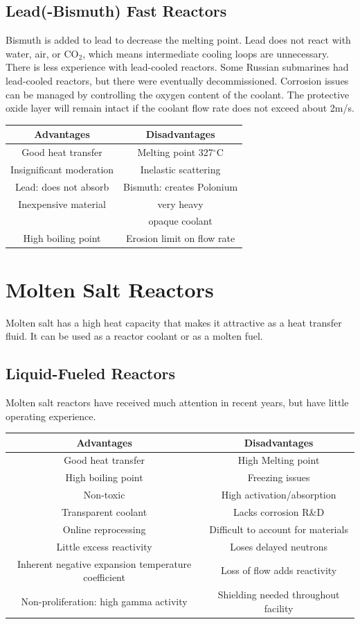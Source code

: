 \subsection{Lead(-Bismuth) Fast Reactors}
Bismuth is added to lead to decrease the melting point. Lead does not react with water, air, or CO$_2$, which means intermediate cooling loops are unnecessary. 
There is less experience with lead-cooled reactors. Some Russian submarines had lead-cooled reactors, but there were eventually decommissioned.
Corrosion issues can be managed by controlling the oxygen content of the coolant. The protective oxide layer will remain intact if the coolant flow rate does not exceed about 2m/s.
\begin{table}[!h]
\begin{tabular}{c|c}
  Advantages & Disadvantages \\
  \hline
  Good heat transfer & Melting point 327$^{\circ}$C\\
  Insignificant moderation & Inelastic scattering\\
  Lead: does not absorb & Bismuth: creates Polonium\\
  Inexpensive material & very heavy\\ 
   & opaque coolant\\
  High boiling point & Erosion limit on flow rate\\
\end{tabular}
\end{table}


\section{Molten Salt Reactors}
Molten salt has a high heat capacity that makes it attractive as a heat transfer fluid. It can be used as a reactor coolant or as a molten fuel.
\subsection{Liquid-Fueled Reactors}
Molten salt reactors have received much attention in recent years, but have little operating experience. 
\begin{table}[!h]
\begin{tabular}{c|c}
  Advantages & Disadvantages \\
  \hline
  Good heat transfer & High Melting point \\
  High boiling point & Freezing issues\\
  Non-toxic & High activation/absorption \\
  Transparent coolant & Lacks corrosion R\&D \\
  Online reprocessing & Difficult to account for materials\\
  Little excess reactivity & Loses delayed neutrons\\
  Inherent negative expansion temperature coefficient & Loss of flow adds reactivity\\
  Non-proliferation: high gamma activity & Shielding needed throughout facility\\
\end{tabular}
\end{table}


